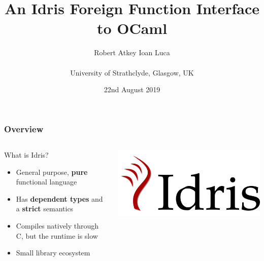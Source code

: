 \documentclass[aspectratio=169]{beamer}
\title{An Idris Foreign Function Interface to OCaml}
\author{Robert Atkey \qquad Ioan Luca\\
  \ \\
  University of Strathclyde, Glasgow, UK}
\date{22nd August 2019}
\begin{document}
\frame{\titlepage}

\newcommand{\youtem}{\quad \textcolor{titlered!80}{---} \quad}

\newcommand{\titlecard}[1]{\begin{frame}%
    \begin{center}%
      \Large \textcolor{titlered}{#1}%
    \end{center}%
  \end{frame}}

\begin{frame}[t]
  \frametitle{Overview}
  \begin{columns}[c]
    \begin{block}{What is Idris?}
      \begin{itemize}
        \item General purpose, \textbf{pure} functional language
        \item Has \textbf{dependent types} and a \textbf{strict} semantics
        \item Compiles natively through C, but the runtime is slow
        \item Small library ecosystem
      \end{itemize}
    \end{block}
    \includegraphics[width=.5\textwidth]{logo.png}
  \end{columns}
\end{frame}
\end{document}
